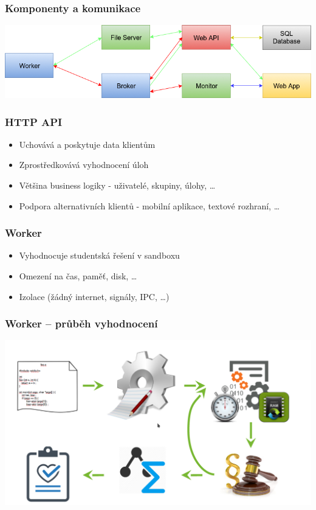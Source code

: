 \documentclass{beamer}
\begin{document}
\begin{frame}
	\frametitle{Komponenty a komunikace}
	\begin{center}
		\includegraphics[width=1\textwidth]{images/communication.png}
	\end{center}
\end{frame}

\begin{frame}
	\frametitle{HTTP API}
	\begin{itemize}
		\item Uchovává a poskytuje data klientům
		\item Zprostředkovává vyhodnocení úloh
		\item Většina business logiky - uživatelé, skupiny, úlohy, \dots
		\item Podpora alternativních klientů - mobilní aplikace, textové rozhraní, \dots
	\end{itemize}
\end{frame}

\begin{frame}
	\frametitle{Worker}
	\begin{itemize}
		\item Vyhodnocuje studentská řešení v sandboxu
		\item Omezení na čas, paměť, disk, \dots
		\item Izolace (žádný internet, signály, IPC, \dots)
	\end{itemize}
\end{frame}

\begin{frame}
	\frametitle{Worker -- průběh vyhodnocení}
	\begin{center}
		\includegraphics[width=1\textwidth]{images/judging.png}
	\end{center}
\end{frame}
\end{document}

